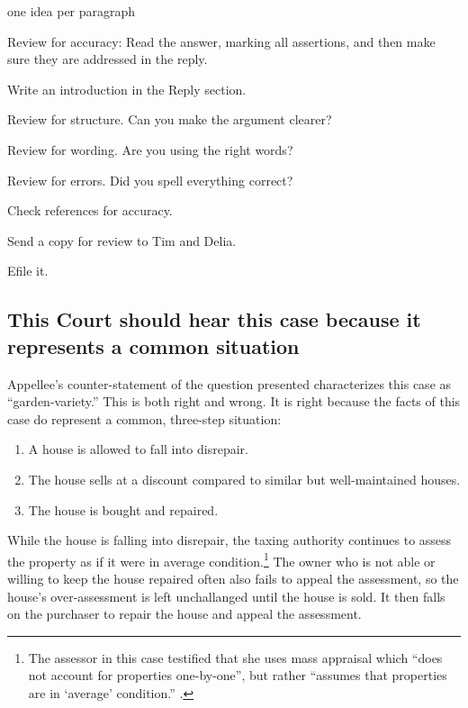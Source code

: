 \documentclass[12pt,\documentclassflag]{michiganCourtOfAppealsBrief}
\begin{document}
\begin{todolist}
\item one idea per paragraph
\item Review for accuracy: Read the answer, marking all assertions, and then make sure they are addressed in the reply.
\item Write an introduction in the Reply section.
\item Review for structure. Can you make the argument clearer?
\item Review for wording. Are you using the right words?
\item Review for errors. Did you spell everything correct? 
\item Check references for accuracy.
\item Send a copy for review to Tim and Delia.
\item Efile it.
\end{todolist}

\subsection{This Court should hear this case because it represents a common situation}

Appellee's counter-statement of the question presented characterizes this case as ``garden-variety.'' This is both right and wrong. It is right because the facts of this case do represent a common, three-step situation:

\begin{enumerate}
\item A house is allowed to fall into disrepair.
\item The house sells at a discount compared to similar but well-maintained houses.
\item The house is bought and repaired.
\end{enumerate}

While the house is falling into disrepair, the taxing authority continues to assess the property as if it were in average condition.\footnote{The assessor in this case testified that she uses mass appraisal which ``does not account for properties one-by-one'', but rather ``assumes that properties are in `average' condition.'' .} The owner who is not able or willing to keep the house repaired often also fails to appeal the assessment, so the house's over-assessment is left unchallanged until the house is sold. It then falls on the purchaser to repair the house and appeal the assessment.
\end{document}

